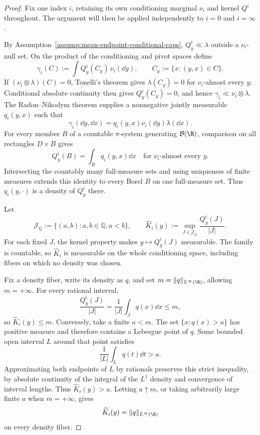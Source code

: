 \begin{proof}
Fix one index $i$, retaining its own conditioning marginal $\nu_i$ and
kernel $Q^i$ throughout.  The argument will then be applied independently to
$i=0$ and $i=\infty$.

By Assumption~\ref{assump:mean-endpoint-conditional-caps}, $Q^i_y\ll\lambda$
outside a $\nu_i$-null set.  On the product of the conditioning and pivot
spaces define
\[
\gamma_i(C):=\int Q^i_y(C_y)\,\nu_i(\dd y),
\qquad C_y:=\{x:(y,x)\in C\}.
\]
If $(\nu_i\otimes\lambda)(C)=0$, Tonelli's theorem gives
$\lambda(C_y)=0$ for $\nu_i$-almost every $y$.  Conditional absolute
continuity then gives $Q^i_y(C_y)=0$, and hence
$\gamma_i\ll\nu_i\otimes\lambda$.  The Radon--Nikodym theorem supplies a
nonnegative jointly measurable $q_i(y,x)$ such that
\[
\gamma_i(\dd y,\dd x)=q_i(y,x)\nu_i(\dd y)\lambda(\dd x).
\]
For every member $B$ of a countable $\pi$-system generating
$\mathcal B(\R)$, comparison on all rectangles $D\times B$ gives
\[
Q^i_y(B)=\int_Bq_i(y,x)\dd x
\quad\text{for $\nu_i$-almost every $y$}.
\]
Intersecting the countably many full-measure sets and using uniqueness of
finite measures extends this identity to every Borel $B$ on one full-measure
set.  Thus $q_i(y,\cdot)$ is a density of $Q^i_y$ there.

Let
\[
\mathscr J_{\mathbb Q}:=\{(a,b):a,b\in\mathbb Q, a<b\},
\qquad
\widehat K_i(y):=\sup_{J\in\mathscr J_{\mathbb Q}}
\frac{Q^i_y(J)}{|J|}.
\]
For each fixed $J$, the kernel property makes $y\mapsto Q^i_y(J)$
measurable.  The family is countable, so $\widehat K_i$ is measurable on the
whole conditioning space, including fibers on which no density was chosen.

Fix a density fiber, write its density as $q$, and set
$m=\|q\|_{L^\infty(\R)}$, allowing $m=+\infty$.  For every rational interval,
\[
\frac{Q^i_y(J)}{|J|}=\frac1{|J|}\int_Jq(x)\dd x\leq m,
\]
so $\widehat K_i(y)\leq m$.  Conversely, take a finite $a<m$.  The set
$\{x:q(x)>a\}$ has positive measure and therefore contains a Lebesgue point
of $q$.  Some bounded open interval $L$ around that point satisfies
\[
\frac1{|L|}\int_Lq(t)\dd t>a.
\]
Approximating both endpoints of $L$ by rationals preserves this strict
inequality, by absolute continuity of the integral of the $L^1$ density and
convergence of interval lengths.  Thus $\widehat K_i(y)>a$.  Letting
$a\uparrow m$, or taking arbitrarily large finite $a$ when $m=+\infty$, gives
\begin{equation}
\widehat K_i(y)=\|q\|_{L^\infty(\R)}
\label{eq:rational-cap-identity}
\end{equation}
on every density fiber.


\end{proof}
